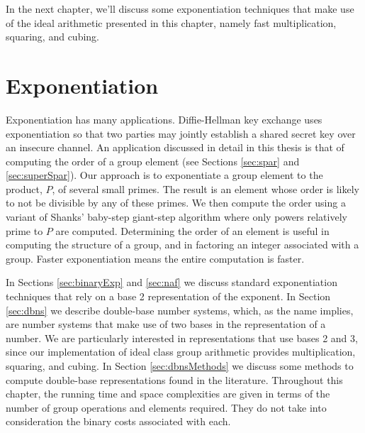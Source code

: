 \documentclass{ucalgthes1}
\theoremstyle{definition}
\begin{document}
In the next chapter, we'll discuss some exponentiation techniques that make use of the ideal arithmetic presented in this chapter, namely fast multiplication, squaring, and cubing.


\chapter{Exponentiation}
\label{chap:exponentiation}

Exponentiation has many applications. Diffie-Hellman key exchange uses exponentiation so that two parties may jointly establish a shared secret key over an insecure channel.  An application discussed in detail in this thesis is that of computing the order of a group element (see Sections \ref{sec:spar} and \ref{sec:superSpar}).  Our approach is to exponentiate a group element to the product, $P$, of several small primes.  The result is an element whose order is likely to not be divisible by any of these primes. We then compute the order using a variant of Shanks' baby-step giant-step algorithm where only powers relatively prime to $P$ are computed.  Determining the order of an element is useful in computing the structure of a group, and in factoring an integer associated with a group.  Faster exponentiation means the entire computation is faster.

In Sections \ref{sec:binaryExp} and \ref{sec:naf} we discuss standard exponentiation techniques that rely on a base 2 representation of the exponent.  In Section \ref{sec:dbns} we describe double-base number systems, which, as the name implies, are number systems that make use of two bases in the representation of a number.  We are particularly interested in representations that use bases 2 and 3, since our implementation of ideal class group arithmetic provides multiplication, squaring, and cubing. In Section \ref{sec:dbnsMethods} we discuss some methods to compute double-base representations found in the literature.  Throughout this chapter, the running time and space complexities are given in terms of the number of group operations and elements required. They do not take into consideration the binary costs associated with each.
\end{document}
